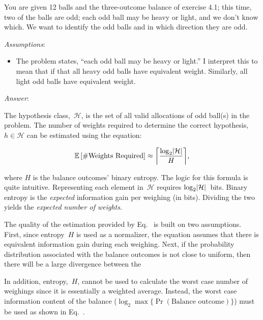 \begin{problem}{4}{14}
  You are given 12 balls and the three-outcome balance of exercise 4.1; this time, two of the balls are odd; each odd ball may be heavy or light, and we don't know which.  We want to identify the odd balls and in which direction they are odd.
\end{problem}

  \noindent
  \textit{Assumptions}:

  \begin{itemize}
    \item The problem states, ``each odd ball may be heavy or light.''  I interpret this to mean that if that all heavy odd balls have equivalent weight.  Similarly, all light odd balls have equivalent weight.
  \end{itemize}

  \noindent
  \textit{Answer}:

  The hypothesis class,~$\mathcal{H}$, is the set of all valid allocations of odd ball(s) in the problem. The number of weights required to determine the correct hypothesis,~$h\in\mathcal{H}$ can be estimated using the equation:

  \begin{equation}\label{eq:p1NumbWeightsRequired}
    \mathbb{E}\left[\#\text{Weights Required}\right] \approx \ceil*{\frac{\log_{2} \abs{\mathcal{H}}}{H}} \text{,}
  \end{equation}

  \noindent
  where $H$ is the balance outcomes' binary entropy.  The logic for this formula is quite intuitive. Representing each element in~$\mathcal{H}$ requires ${\log_{2}\lvert\mathcal{H}\rvert}$~bits.  Binary entropy is the \textit{expected} information gain per weighing (in bits).  Dividing the two yields the \textit{expected number of weights}.

  The quality of the estimation provided by  Eq.~ is built on two assumptions.  First, since entropy~$H$ is used as a normalizer, the equation assumes that there is equivalent information gain during each weighing.  Next, if the probability distribution associated with the balance outcomes is not close to uniform, then there will be a large divergence between the

  In addition, entropy,~$H$, cannot be used to calculate the worst case number of weighings since it is essentially a weighted average.  Instead, the worst case information content of the balance ($\log_{2} \max \{\Pr(\text{Balance outcome})\}$) must be used as shown in Eq.~.

